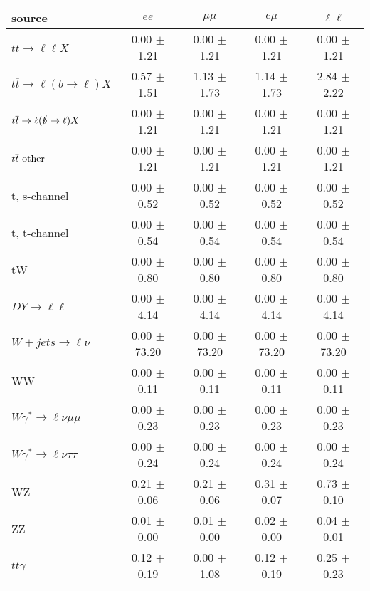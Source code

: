 \begin{tabular}{l|cccc} \hline\hline
source & $ee$ & $\mu\mu$ & $e\mu$ & $\ell\ell $ \\
\hline
$t\overline{t} \rightarrow \ell \ell X$ &  0.00 $\pm$  1.21 &  0.00 $\pm$  1.21 &  0.00 $\pm$  1.21 &  0.00 $\pm$  1.21 \\
$t\overline{t} \rightarrow \ell (b \rightarrow \ell) X$ &  0.57 $\pm$  1.51 &  1.13 $\pm$  1.73 &  1.14 $\pm$  1.73 &  2.84 $\pm$  2.22 \\
$t\overline{t} \rightarrow \ell (\slashed b \rightarrow \ell) X$ &  0.00 $\pm$  1.21 &  0.00 $\pm$  1.21 &  0.00 $\pm$  1.21 &  0.00 $\pm$  1.21 \\
        $t\overline{t}\ \rm{other}$ &  0.00 $\pm$  1.21 &  0.00 $\pm$  1.21 &  0.00 $\pm$  1.21 &  0.00 $\pm$  1.21 \\
\hline
                       t, s-channel &  0.00 $\pm$  0.52 &  0.00 $\pm$  0.52 &  0.00 $\pm$  0.52 &  0.00 $\pm$  0.52 \\
                       t, t-channel &  0.00 $\pm$  0.54 &  0.00 $\pm$  0.54 &  0.00 $\pm$  0.54 &  0.00 $\pm$  0.54 \\
                                 tW &  0.00 $\pm$  0.80 &  0.00 $\pm$  0.80 &  0.00 $\pm$  0.80 &  0.00 $\pm$  0.80 \\
\hline
         $DY \rightarrow \ell \ell$ &  0.00 $\pm$  4.14 &  0.00 $\pm$  4.14 &  0.00 $\pm$  4.14 &  0.00 $\pm$  4.14 \\
      $W+jets \rightarrow \ell \nu$ &  0.00 $\pm$ 73.20 &  0.00 $\pm$ 73.20 &  0.00 $\pm$ 73.20 &  0.00 $\pm$ 73.20 \\
                                 WW &  0.00 $\pm$  0.11 &  0.00 $\pm$  0.11 &  0.00 $\pm$  0.11 &  0.00 $\pm$  0.11 \\
\hline
$W\gamma^{*} \rightarrow \ell \nu \mu\mu$ &  0.00 $\pm$  0.23 &  0.00 $\pm$  0.23 &  0.00 $\pm$  0.23 &  0.00 $\pm$  0.23 \\
$W\gamma^{*} \rightarrow \ell \nu \tau\tau$ &  0.00 $\pm$  0.24 &  0.00 $\pm$  0.24 &  0.00 $\pm$  0.24 &  0.00 $\pm$  0.24 \\
                                 WZ &  0.21 $\pm$  0.06 &  0.21 $\pm$  0.06 &  0.31 $\pm$  0.07 &  0.73 $\pm$  0.10 \\
                                 ZZ &  0.01 $\pm$  0.00 &  0.01 $\pm$  0.00 &  0.02 $\pm$  0.00 &  0.04 $\pm$  0.01 \\
\hline
              $t\overline{t}\gamma$ &  0.12 $\pm$  0.19 &  0.00 $\pm$  1.08 &  0.12 $\pm$  0.19 &  0.25 $\pm$  0.23 \\

\end{tabular}
